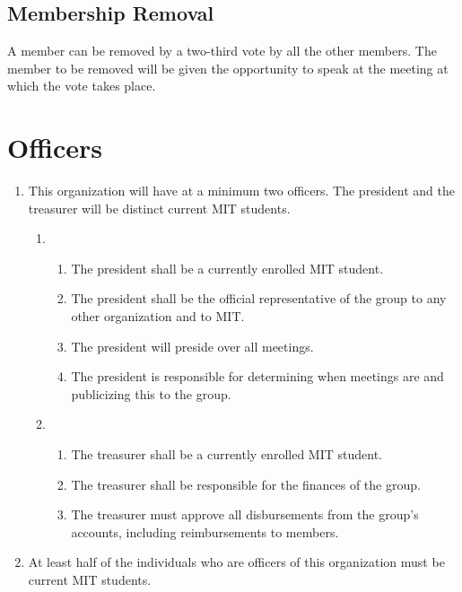 \documentclass[12pt]{article}
\begin{document}
\subsection{Membership Removal}
A member can be removed by a two-third vote by all the other members.
The member to be removed will be given the opportunity to speak at the meeting at which the vote takes place.

\section{Officers}
\begin{enumerate}
    \item This organization will have at a minimum two officers. The president and the treasurer will be distinct current MIT students.
    \begin{enumerate}
        \item {}
        \begin{enumerate}
            \item The president shall be a currently enrolled MIT student.
            
            \item The president shall be the official representative of the group to any other organization and to MIT.
            
            \item The president will preside over all meetings.
            
            \item The president is responsible for determining when meetings are and publicizing this to the group.
        \end{enumerate}

        \item {}
        \begin{enumerate}
            \item The treasurer shall be a currently enrolled MIT student.
            
            \item The treasurer shall be responsible for the finances of the group.
            
            \item The treasurer must approve all disbursements from the group’s accounts, including reimbursements to members.
        \end{enumerate}
    \end{enumerate}

    \item At least half of the individuals who are officers of this organization must be current MIT students.
\end{enumerate}
\end{document}
